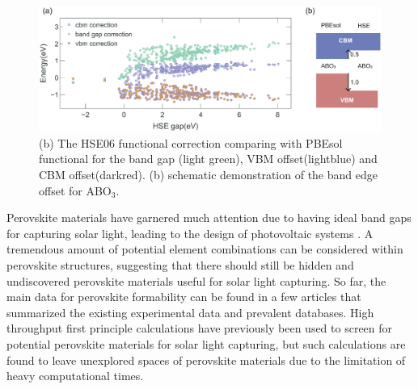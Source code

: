 \documentclass[%
reprint,
superscriptaddress,
citeautoscript,
 amsmath,amssymb,
 aps,
 prl,
floatfix,
]{revtex4-1}
\begin{document}


\begin{figure}[ht]
\begin{center}
\includegraphics[width=6.0in]{Figures/fig2_v1.eps}
\end{center}
\caption{ (b) The HSE06 functional correction comparing with PBEsol functional for the band gap (light green), VBM offset(lightblue) and CBM offset(darkred). (b) schematic demonstration of the band edge offset for ABO$_{3}$. 
}
\label{fig2}
\end{figure}

Perovskite materials have garnered much attention due to having ideal band gaps for capturing solar light, leading to the design of photovoltaic systems \cite{Pilania2013,Lee2012}. A tremendous amount of potential element combinations can be considered within perovskite structures, suggesting that there should still be hidden and undiscovered perovskite materials useful for solar light capturing. So far, the main data for perovskite formability can be found in a few articles that summarized the existing experimental data and prevalent databases. High throughput first principle calculations have previously been used to screen for potential perovskite materials for solar light capturing\cite{Huo2018, Sun2015}, but such calculations are found to leave unexplored spaces of perovskite materials due to the limitation of heavy computational times. 


\end{document}
